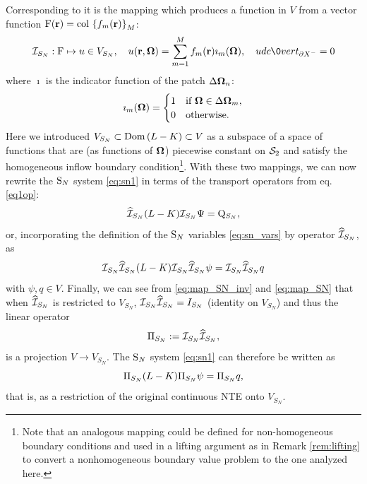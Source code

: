 %
Corresponding to it is the mapping which produces a function in $V$ from a vector function 
\mbox{$\mathrm{F}(\br) = \colset{f_m(\br)}{\idxset{M}}$}:
\begin{equation}\label{eq:map_SN}
\PiSN: \mathrm{F} \mapsto u\in V_{S_N},\quad
u(\br,\bomega) = \sum_{m=1}^M f_m(\br)\imath_m(\bomega),\quad
udc\0vert_{\pX[-]} = 0
\end{equation}
where $\imath$ is the indicator function of the patch $\Delta\bomega_n$:
\begin{equation}\label{eq:indicator}
\imath_m(\bomega) = \pw{1}{if $\bomega \in \Delta\bomega_m$}{0}{otherwise.}
\end{equation}
Here we introduced $V_{S_N}\subset\Dom{L-K} \subset V$ as a subspace of a space of functions that are (as functions of
$\bomega$) piecewise constant on $\Sphere$ and satisfy the homogeneous inflow boundary condition\footnote{Note that an
analogous mapping could be defined for non-homogeneous boundary conditions and used in a lifting argument
as in Remark \ref{rem:lifting} to convert a nonhomogeneous boundary value problem to the one analyzed here.}. With
these two mappings, we can now rewrite the $\SN$ system \eqref{eq:sn1} in terms of the transport operators from eq.
\eqref{eq1op}:
\begin{equation}\label{eq:sn_op}
	\PihSN (\op{L} - \op{K}) \PiSN \Psi = \mathrm{Q}_{S_N},
\end{equation}
or, incorporating the definition of the $\SN$ variables \eqref{eq:sn_vars} by operator $\PihSN$, as
\begin{equation}\label{eq:sn_op2}
	\PiSN \PihSN (\op{L} - \op{K})\PiSN \PihSN \psi = \PiSN \PihSN q
\end{equation} 
with $\psi, q \in V$. Finally, we can see from \eqref{eq:map_SN_inv} and \eqref{eq:map_SN} that when $\PihSN$ is
restricted to $V_{S_N}$, $\PiSN\PihSN = I_{S_N}$ (identity on $V_{S_N}$) and thus the linear operator
\begin{equation}\label{eq:proj_sn}
	\Projop[S_N] := \PiSN\PihSN,
\end{equation}
is a projection $V\to V_{S_N}$. The $\SN$ system \eqref{eq:sn1} can
therefore be written as
\begin{equation}\label{eq:sn_op3}
	\Projop[S_N] (\op{L} - \op{K})\Projop[S_N] \psi = \Projop[S_N] q,
\end{equation}
that is, as a restriction of the original continuous NTE onto $V_{S_N}$. 

